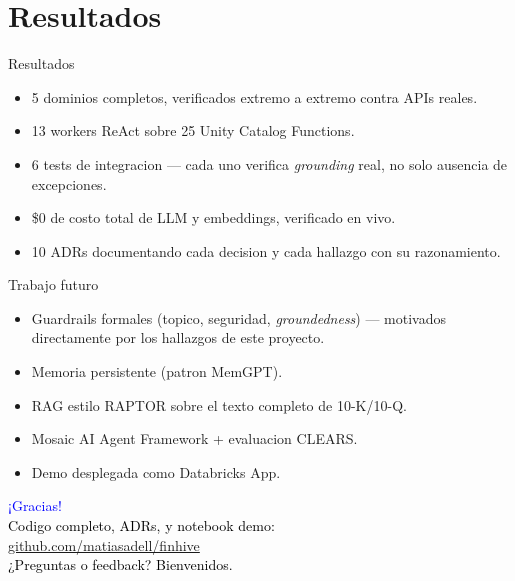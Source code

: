 \documentclass[11pt]{beamer}
\newcommand{\hlg}[1]{\textcolor{green!50!black}{#1}}
\begin{document}
\section{Resultados}

\begin{frame}{Resultados}
\begin{itemize}
    \item \hlg{5 dominios} completos, verificados extremo a extremo contra APIs reales.
    \item \hlg{13 workers ReAct} sobre \hlg{25 Unity Catalog Functions}.
    \item \hlg{6 tests de integracion} --- cada uno verifica \emph{grounding} real, no
    solo ausencia de excepciones.
    \item \hlg{\$0} de costo total de LLM y embeddings, verificado en vivo.
    \item \hlg{10 ADRs} documentando cada decision y cada hallazgo con su razonamiento.
\end{itemize}
\end{frame}

\begin{frame}{Trabajo futuro}
\begin{itemize}
    \item Guardrails formales (topico, seguridad, \emph{groundedness}) --- motivados
    directamente por los hallazgos de este proyecto.
    \item Memoria persistente (patron MemGPT).
    \item RAG estilo RAPTOR sobre el texto completo de 10-K/10-Q.
    \item Mosaic AI Agent Framework + evaluacion CLEARS.
    \item Demo desplegada como Databricks App.
\end{itemize}
\end{frame}

\begin{frame}[plain]
\centering
\textcolor{blue}{\Huge{¡Gracias!}}\\
\vspace{1em}
\textcolor{black}{\large Codigo completo, ADRs, y notebook demo:}\\
\vspace{0.5em}
\textcolor{blue}{\Large \url{github.com/matiasadell/finhive}}\\
\vspace{1em}
\textcolor{black}{\normalsize ¿Preguntas o feedback? Bienvenidos.}
\end{frame}
\end{document}
